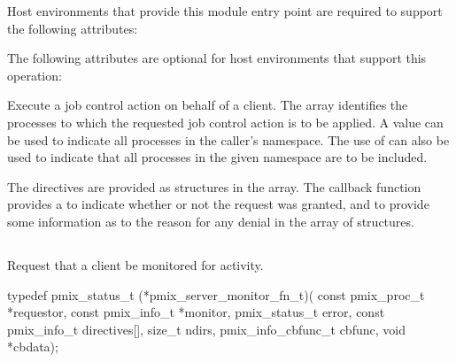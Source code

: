 Host environments that provide this module entry point are required to support the following attributes:


\reqattrend

\optattrstart
The following attributes are optional for host environments that support this operation:


\optattrend

\descr

Execute a job control action on behalf of a client. The  array identifies the processes to which the requested job control action is to be applied.
A  value can be used to indicate all processes in the caller's namespace.
The use of  can also be used to indicate that all processes in the given namespace are to be included.

The directives are provided as  structures in the  array.
The callback function provides a  to indicate whether or not the request was granted, and to provide some information as to the reason for any denial in the  array of  structures.


\subsection{}

\summary

Request that a client be monitored for activity.

\format

\cspecificstart
\begin{codepar}
typedef pmix_status_t (*pmix_server_monitor_fn_t)(
                             const pmix_proc_t *requestor,
                             const pmix_info_t *monitor, pmix_status_t error,
                             const pmix_info_t directives[], size_t ndirs,
                             pmix_info_cbfunc_t cbfunc, void *cbdata);
\end{codepar}
\cspecificend

